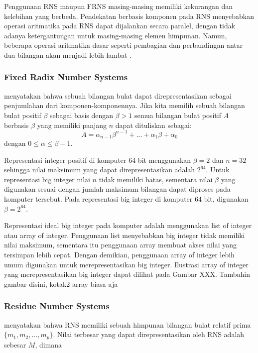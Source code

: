 Penggunaan RNS maupun FRNS masing-masing memiliki kekurangan dan kelebihan yang berbeda. Pendekatan berbasis komponen pada RNS menyebabkan operasi aritmatika pada RNS dapat dijalankan secara paralel, dengan tidak adanya ketergantungan untuk masing-masing elemen himpunan. Namun, beberapa operasi aritmatika dasar seperti pembagian dan perbandingan antar dua bilangan akan menjadi lebih lambat \citep{gpu_bignum}.

\subsubsection{Fixed Radix Number Systems} \label{frns}

\citet{modern_comp_math} menyatakan bahwa sebuah bilangan bulat dapat direpresentasikan sebagai penjumlahan dari komponen-komponennya. Jika kita memilih sebuah bilangan bulat positif $\beta$ sebagai basis dengan $\beta > 1 $ semua bilangan bulat positif $A$ berbasis $\beta$ yang memiliki panjang $n$ dapat dituliskan sebagai:
\begin{equation} \label{eq:frns_rep}
  A = \alpha_{n-1}\beta^{n-1}+...+\alpha_{1}\beta+\alpha_{0}
\end{equation}
dengan $0 \leq \alpha \leq \beta -1$.

Representasi integer positif di komputer 64 bit menggunakan $\beta = 2$ dan $n = 32$ sehingga nilai maksimum yang dapat direpresentasikan adalah $2^{64}$. Untuk representasi big integer nilai $n$ tidak memiliki batas, sementara nilai $\beta$ yang digunakan sesuai dengan jumlah maksimum bilangan dapat diproses pada komputer tersebut. Pada representasi big integer di komputer 64 bit, digunakan $\beta = 2^{64}$.

Representasi ideal big integer pada komputer adalah menggunakan list of integer atau array of integer. Penggunaan list menyebabkan big integer tidak memiliki nilai maksimum, sementara itu penggunaan array membuat akses nilai yang tersimpan lebih cepat. Dengan demikian, penggunaan array of integer lebih umum digunakan untuk merepresentasikan big integer. Ilustrasi array of integer yang merepresentasikan big integer dapat dilihat pada Gambar XXX.
\colorbox{BurntOrange}{Tambahin gambar disini, kotak2 array biasa aja}
\subsubsection{Residue Number Systems} \label{rns}
\citet{rns_survey} menyatakan bahwa RNS memiliki sebuah himpunan bilangan bulat relatif prima $\{m_1,m_2,...,m_p\}$. Nilai terbesar yang dapat direpresentasikan oleh RNS adalah sebesar $M$, dimana

